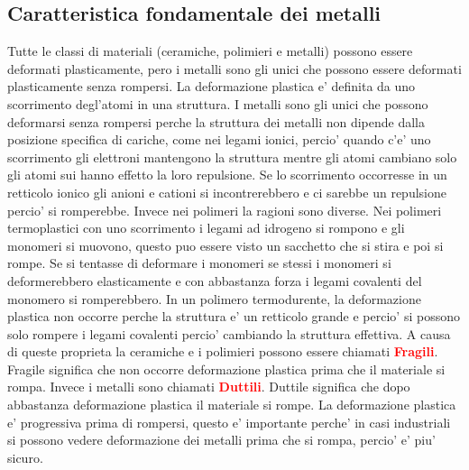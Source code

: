 \documentclass{article}
\begin{document}
            \subsection{Caratteristica fondamentale dei metalli}
                Tutte le classi di materiali (ceramiche, polimieri e metalli) possono essere deformati plasticamente,
                pero i metalli sono gli unici che possono essere deformati plasticamente senza rompersi.
                \newline \newline La deformazione plastica e' definita da uno scorrimento degl'atomi in una struttura.
                \newline \newline I metalli sono gli unici che possono deformarsi senza rompersi perche la struttura dei metalli non dipende dalla posizione specifica di cariche,
                come nei legami ionici, percio' quando c'e' uno scorrimento gli elettroni mantengono la struttura mentre gli atomi cambiano solo gli atomi sui hanno effetto la loro repulsione.
                \newline \newline Se lo scorrimento occorresse in un retticolo ionico gli anioni e cationi si incontrerebbero e ci sarebbe un repulsione percio' si romperebbe.
                \newline \newline Invece nei polimeri la ragioni sono diverse. Nei polimeri termoplastici con uno scorrimento i legami ad idrogeno si rompono e gli monomeri si muovono,
                 questo puo essere visto un sacchetto che si stira e poi si rompe. Se si tentasse di deformare i monomeri se stessi i monomeri si deformerebbero elasticamente e con abbastanza
                 forza i legami covalenti del monomero si romperebbero. In un polimero termodurente, la deformazione plastica non occorre perche la struttura e' un retticolo grande e percio'
                 si possono solo rompere i legami covalenti percio' cambiando la struttura effettiva.
                 \newline \newline A causa di queste proprieta la ceramiche e i polimieri possono essere chiamati \textcolor{red}{\textbf{Fragili}}. Fragile significa che non occorre deformazione plastica prima
                 che il materiale si rompa. Invece i metalli sono chiamati \textcolor{red}{\textbf{Duttili}}. Duttile significa che dopo abbastanza deformazione plastica il materiale si rompe. La deformazione
                 plastica e' progressiva prima di rompersi, questo e' importante perche' in casi industriali si possono vedere deformazione dei metalli prima che si rompa, percio' e' piu' sicuro.
    \newpage
\end{document}
